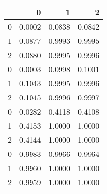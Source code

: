 \begin{tabular}{lrrr}
\toprule
{} &       0 &       1 &       2 \\
\midrule
0 &  0.0002 &  0.0838 &  0.0842 \\
1 &  0.0877 &  0.9993 &  0.9995 \\
2 &  0.0880 &  0.9995 &  0.9996 \\
0 &  0.0003 &  0.0998 &  0.1001 \\
1 &  0.1043 &  0.9995 &  0.9996 \\
2 &  0.1045 &  0.9996 &  0.9997 \\
0 &  0.0282 &  0.4118 &  0.4108 \\
1 &  0.4153 &  1.0000 &  1.0000 \\
2 &  0.4144 &  1.0000 &  1.0000 \\
0 &  0.9983 &  0.9966 &  0.9964 \\
1 &  0.9960 &  1.0000 &  1.0000 \\
2 &  0.9959 &  1.0000 &  1.0000 \\
\bottomrule
\end{tabular}
